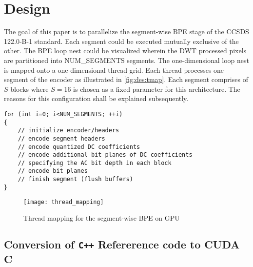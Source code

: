 \chapter{Design\label{cha:chapter4}}
The goal of this paper is to parallelize the segment-wise \gls{BPE} stage of the CCSDS 122.0-B-1 standard. Each segment could be executed mutually exclusive of the other. The \gls{BPE} loop nest could be visualized wherein the DWT processed pixels are partitioned into NUM\_SEGMENTS segments. The one-dimensional loop nest is mapped onto a one-dimensional thread grid. Each thread processes one segment of the encoder as illustrated in \autoref{fig:des:tmap}. Each segment comprises of $S$ blocks where $S=16$ is chosen as a fixed parameter for this architecture. The reasons for this configuration shall be explained subsequently.
\\
\begin{verbatim}
for (int i=0; i<NUM_SEGMENTS; ++i)
{
    // initialize encoder/headers 
    // encode segment headers 
    // encode quantized DC coefficients 
    // encode additional bit planes of DC coefficients 
    // specifying the AC bit depth in each block 
    // encode bit planes 
    // finish segment (flush buffers) 
}
\end{verbatim}
\begin{figure}[tb]
  \centering
  \texttt{[image: thread\_mapping]}
  \caption{Thread mapping for the segment-wise BPE on GPU}
  \label{fig:des:tmap}
\end{figure}

\section{Conversion of \texttt{C++} Refererence code to \gls{CUDA} C}\label{sec:convrefcud}

